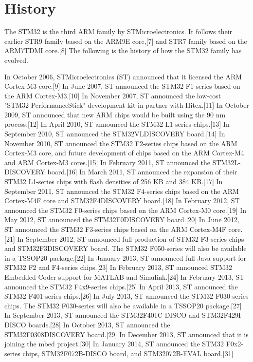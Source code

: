 \documentclass{aip-cp}
\begin{document}
\section{History}

The STM32 is the third ARM family by STMicroelectronics. It follows their earlier STR9 family based on the ARM9E core,[7] and STR7 family based on the ARM7TDMI core.[8] The following is the history of how the STM32 family has evolved.

In October 2006, STMicroelectronics (ST) announced that it licensed the ARM Cortex-M3 core.[9]
In June 2007, ST announced the STM32 F1-series based on the ARM Cortex-M3.[10]
In November 2007, ST announced the low-cost "STM32-PerformanceStick" development kit in partner with Hitex.[11]
In October 2009, ST announced that new ARM chips would be built using the 90 nm process.[12]
In April 2010, ST announced the STM32 L1-series chips.[13]
In September 2010, ST announced the STM32VLDISCOVERY board.[14]
In November 2010, ST announced the STM32 F2-series chips based on the ARM Cortex-M3 core, and future development of chips based on the ARM Cortex-M4 and ARM Cortex-M3 cores.[15]
In February 2011, ST announced the STM32L-DISCOVERY board.[16]
In March 2011, ST announced the expansion of their STM32 L1-series chips with flash densities of 256 KB and 384 KB.[17]
In September 2011, ST announced the STM32 F4-series chips based on the ARM Cortex-M4F core and STM32F4DISCOVERY board.[18]
In February 2012, ST announced the STM32 F0-series chips based on the ARM Cortex-M0 core.[19]
In May 2012, ST announced the STM32F0DISCOVERY board.[20]
In June 2012, ST announced the STM32 F3-series chips based on the ARM Cortex-M4F core.[21]
In September 2012, ST announced full-production of STM32 F3-series chips and STM32F3DISCOVERY board. The STM32 F050-series will also be available in a TSSOP20 package.[22]
In January 2013, ST announced full Java support for STM32 F2 and F4-series chips.[23]
In February 2013, ST announced STM32 Embedded Coder support for MATLAB and Simulink.[24]
In February 2013, ST announced the STM32 F4x9-series chips.[25]
In April 2013, ST announced the STM32 F401-series chips.[26]
In July 2013, ST announced the STM32 F030-series chips. The STM32 F030-series will also be available in a TSSOP20 package.[27]
In September 2013, ST announced the STM32F401C-DISCO and STM32F429I-DISCO boards.[28]
In October 2013, ST announced the STM32F0308DISCOVERY board.[29]
In December 2013, ST announced that it is joining the mbed project.[30]
In January 2014, ST announced the STM32 F0x2-series chips, STM32F072B-DISCO board, and STM32072B-EVAL board.[31]
\end{document}

